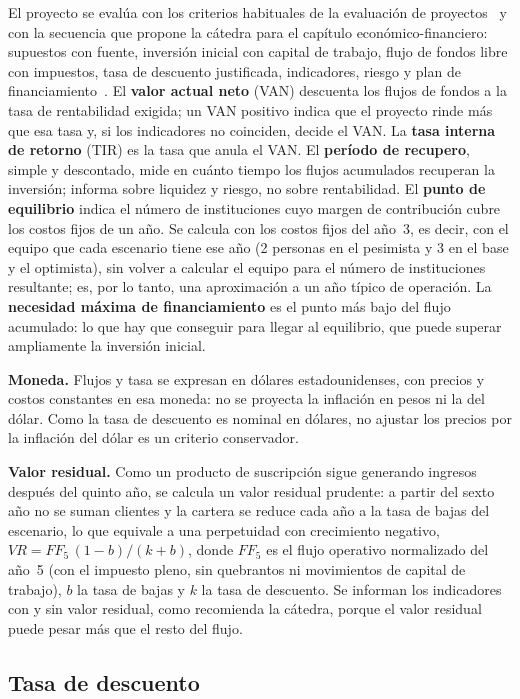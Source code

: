 El proyecto se evalúa con los criterios habituales de la evaluación de proyectos~\parencite{SapagChain2014} y con la secuencia que propone la cátedra para el capítulo económico-financiero: supuestos con fuente, inversión inicial con capital de trabajo, flujo de fondos libre con impuestos, tasa de descuento justificada, indicadores, riesgo y plan de financiamiento~\parencite{UADE2026ModeloNegocio}. El \textbf{valor actual neto} (VAN) descuenta los flujos de fondos a la tasa de rentabilidad exigida; un VAN positivo indica que el proyecto rinde más que esa tasa y, si los indicadores no coinciden, decide el VAN. La \textbf{tasa interna de retorno} (TIR) es la tasa que anula el VAN. El \textbf{período de recupero}, simple y descontado, mide en cuánto tiempo los flujos acumulados recuperan la inversión; informa sobre liquidez y riesgo, no sobre rentabilidad. El \textbf{punto de equilibrio} indica el número de instituciones cuyo margen de contribución cubre los costos fijos de un año. Se calcula con los costos fijos del año~3, es decir, con el equipo que cada escenario tiene ese año (2 personas en el pesimista y 3 en el base y el optimista), sin volver a calcular el equipo para el número de instituciones resultante; es, por lo tanto, una aproximación a un año típico de operación. La \textbf{necesidad máxima de financiamiento} es el punto más bajo del flujo acumulado: lo que hay que conseguir para llegar al equilibrio, que puede superar ampliamente la inversión inicial.

\textbf{Moneda.} Flujos y tasa se expresan en dólares estadounidenses, con precios y costos constantes en esa moneda: no se proyecta la inflación en pesos ni la del dólar. Como la tasa de descuento es nominal en dólares, no ajustar los precios por la inflación del dólar es un criterio conservador.

\textbf{Valor residual.} Como un producto de suscripción sigue generando ingresos después del quinto año, se calcula un valor residual prudente: a partir del sexto año no se suman clientes y la cartera se reduce cada año a la tasa de bajas del escenario, lo que equivale a una perpetuidad con crecimiento negativo, $VR = FF_5\,(1-b)/(k+b)$, donde $FF_5$ es el flujo operativo normalizado del año~5 (con el impuesto pleno, sin quebrantos ni movimientos de capital de trabajo), $b$ la tasa de bajas y $k$ la tasa de descuento. Se informan los indicadores con y sin valor residual, como recomienda la cátedra, porque el valor residual puede pesar más que el resto del flujo.

\subsection{Tasa de descuento}

